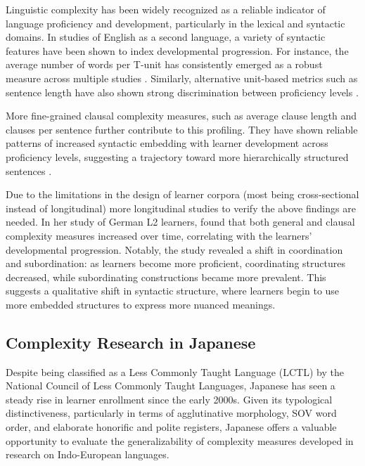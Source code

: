 Linguistic complexity has been widely recognized as a reliable indicator of language proficiency and development,
particularly in the lexical and syntactic domains. In studies of English as a second language, a variety of syntactic
features have been shown to index developmental
progression. For instance, the average number of words per T-unit has consistently emerged as a robust measure
across multiple studies \citep{Ortega2003,Wolfe1998,Lu2011, Lu2010, Iwashita2006}. Similarly, alternative unit-based
metrics such as sentence length have also shown strong discrimination between
proficiency levels \citep{Ortega2003, Lu2011}.

More fine-grained clausal complexity measures, such as average clause length and clauses per sentence further
contribute to this profiling. They have shown reliable patterns of increased syntactic embedding with learner
development across proficiency levels, suggesting a trajectory toward more hierarchically structured sentences \citep{Ortega2003, Lu2011}.

Due to the limitations in the design of learner corpora (most being cross-sectional instead of longitudinal) more
longitudinal studies to verify the above findings are needed. In her study of German L2 learners, \citet{Vyatkina2012}
found
that both general and clausal complexity measures increased over time, correlating with the learners' developmental
progression. Notably, the study revealed a shift in coordination and subordination: as learners become more
proficient, coordinating structures decreased, while subordinating constructions became more prevalent. This suggests
a qualitative shift in syntactic structure, where learners begin to use more embedded structures to express more
nuanced
meanings.


\subsection{Complexity Research in Japanese}
Despite being classified as a Less Commonly Taught Language (LCTL) by the National Council of Less Commonly Taught
Languages, Japanese has seen a steady rise in learner enrollment since the early 2000s. Given its
typological distinctiveness, particularly in terms of agglutinative morphology, SOV word order, and elaborate
honorific and polite registers, Japanese offers a valuable opportunity to evaluate the generalizability of
complexity measures developed in research on Indo-European languages.

